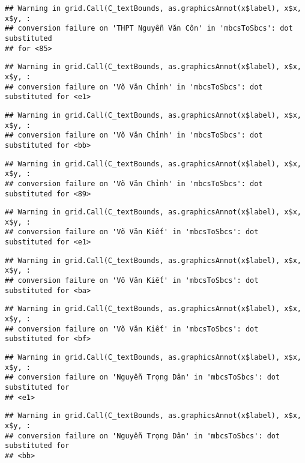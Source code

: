 \documentclass[
]{article}
\begin{document}
\begin{verbatim}
## Warning in grid.Call(C_textBounds, as.graphicsAnnot(x$label), x$x, x$y, :
## conversion failure on 'THPT Nguyễn Văn Côn' in 'mbcsToSbcs': dot substituted
## for <85>
\end{verbatim}

\begin{verbatim}
## Warning in grid.Call(C_textBounds, as.graphicsAnnot(x$label), x$x, x$y, :
## conversion failure on 'Võ Văn Chỉnh' in 'mbcsToSbcs': dot substituted for <e1>
\end{verbatim}

\begin{verbatim}
## Warning in grid.Call(C_textBounds, as.graphicsAnnot(x$label), x$x, x$y, :
## conversion failure on 'Võ Văn Chỉnh' in 'mbcsToSbcs': dot substituted for <bb>
\end{verbatim}

\begin{verbatim}
## Warning in grid.Call(C_textBounds, as.graphicsAnnot(x$label), x$x, x$y, :
## conversion failure on 'Võ Văn Chỉnh' in 'mbcsToSbcs': dot substituted for <89>
\end{verbatim}

\begin{verbatim}
## Warning in grid.Call(C_textBounds, as.graphicsAnnot(x$label), x$x, x$y, :
## conversion failure on 'Võ Văn Kiết' in 'mbcsToSbcs': dot substituted for <e1>
\end{verbatim}

\begin{verbatim}
## Warning in grid.Call(C_textBounds, as.graphicsAnnot(x$label), x$x, x$y, :
## conversion failure on 'Võ Văn Kiết' in 'mbcsToSbcs': dot substituted for <ba>
\end{verbatim}

\begin{verbatim}
## Warning in grid.Call(C_textBounds, as.graphicsAnnot(x$label), x$x, x$y, :
## conversion failure on 'Võ Văn Kiết' in 'mbcsToSbcs': dot substituted for <bf>
\end{verbatim}

\begin{verbatim}
## Warning in grid.Call(C_textBounds, as.graphicsAnnot(x$label), x$x, x$y, :
## conversion failure on 'Nguyễn Trọng Dân' in 'mbcsToSbcs': dot substituted for
## <e1>
\end{verbatim}

\begin{verbatim}
## Warning in grid.Call(C_textBounds, as.graphicsAnnot(x$label), x$x, x$y, :
## conversion failure on 'Nguyễn Trọng Dân' in 'mbcsToSbcs': dot substituted for
## <bb>
\end{verbatim}
\end{document}

